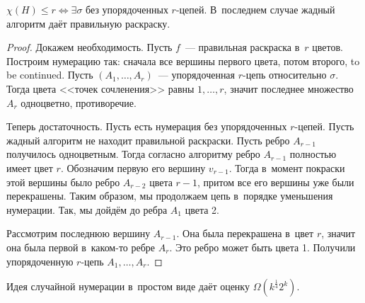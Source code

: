 \documentclass{article}
\begin{document}
\begin{theorem}
	$\chi(H) \le r \Leftrightarrow \exists \sigma$ без упорядоченных $r$-цепей.
	В~последнем случае жадный алгоритм даёт правильную раскраску.
\end{theorem}
\begin{proof}
	Докажем необходимость. Пусть $f$~--- правильная раскраска в~$r$ цветов.
	Построим нумерацию так: сначала все вершины первого цвета, потом второго, to
	be continued. Пусть $(A_1, \ldots, A_r)$~--- упорядоченная $r$-цепь
	относительно $\sigma$. Тогда цвета <<точек сочленения>> равны $1, \ldots, r$,
	значит последнее множество $A_r$ одноцветно, противоречие.

	Теперь достаточность. Пусть есть нумерация без упорядоченных $r$-цепей. Пусть
	жадный алгоритм не находит правильной раскраски. Пусть ребро $A_{r-1}$
	получилось одноцветным. Тогда согласно алгоритму ребро $A_{r-1}$ полностью
	имеет цвет $r$. Обозначим первую его вершину $v_{r-1}$. Тогда в~момент
	покраски этой вершины было ребро $A_{r-2}$ цвета $r-1$, притом все его вершины
	уже были перекрашены. Таким образом, мы продолжаем цепь в~порядке уменьшения
	нумерации. Так, мы дойдём до ребра $A_1$ цвета 2.

	Рассмотрим последнюю вершину $A_{r-1}$. Она была перекрашена в~цвет $r$,
	значит она была первой в~каком-то ребре $A_r$. Это ребро может быть цвета 1.
	Получили упорядоченную $r$-цепь $A_1, \ldots, A_r$.
\end{proof}

\begin{exercise}
	Идея случайной нумерации в~простом виде даёт оценку $\Omega(k^\frac{1}{4}
	2^k)$.
\end{exercise}
\end{document}
